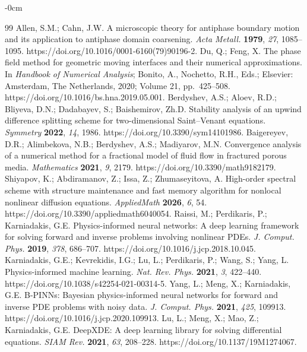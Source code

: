 \documentclass[symmetry,article,submit,moreauthors]{Definitions/mdpi}
\begin{document}
\begin{adjustwidth}{-\extralength}{0cm}

\begin{thebibliography}{99}
 Allen, S.M.; Cahn, J.W. A microscopic theory for antiphase boundary motion and its application to antiphase domain coarsening. \textit{Acta Metall.} \textbf{1979}, \textit{27}, 1085--1095. https://doi.org/10.1016/0001-6160(79)90196-2.
 Du, Q.; Feng, X. The phase field method for geometric moving interfaces and their numerical approximations. In \textit{Handbook of Numerical Analysis}; Bonito, A., Nochetto, R.H., Eds.; Elsevier: Amsterdam, The Netherlands, 2020; Volume 21, pp.\ 425--508. https://doi.org/10.1016/bs.hna.2019.05.001.
 Berdyshev, A.S.; Aloev, R.D.; Bliyeva, D.N.; Dadabayev, S.; Baishemirov, Zh.D. Stability analysis of an upwind difference splitting scheme for two-dimensional Saint--Venant equations. \textit{Symmetry} \textbf{2022}, \textit{14}, 1986. https://doi.org/10.3390/sym14101986.
 Baigereyev, D.R.; Alimbekova, N.B.; Berdyshev, A.S.; Madiyarov, M.N. Convergence analysis of a numerical method for a fractional model of fluid flow in fractured porous media. \textit{Mathematics} \textbf{2021}, \textit{9}, 2179. https://doi.org/10.3390/math9182179.
 Shiyapov, K.; Abdiramanov, Z.; Issa, Z.; Zhumaseyitova, A. High-order spectral scheme with structure maintenance and fast memory algorithm for nonlocal nonlinear diffusion equations. \textit{AppliedMath} \textbf{2026}, \textit{6}, 54. https://doi.org/10.3390/appliedmath6040054.
 Raissi, M.; Perdikaris, P.; Karniadakis, G.E. Physics-informed neural networks: A deep learning framework for solving forward and inverse problems involving nonlinear PDEs. \textit{J. Comput. Phys.} \textbf{2019}, \textit{378}, 686--707. https://doi.org/10.1016/j.jcp.2018.10.045.
 Karniadakis, G.E.; Kevrekidis, I.G.; Lu, L.; Perdikaris, P.; Wang, S.; Yang, L. Physics-informed machine learning. \textit{Nat. Rev. Phys.} \textbf{2021}, \textit{3}, 422--440. https://doi.org/10.1038/s42254-021-00314-5.
 Yang, L.; Meng, X.; Karniadakis, G.E. B-PINNs: Bayesian physics-informed neural networks for forward and inverse PDE problems with noisy data. \textit{J. Comput. Phys.} \textbf{2021}, \textit{425}, 109913. https://doi.org/10.1016/j.jcp.2020.109913.
 Lu, L.; Meng, X.; Mao, Z.; Karniadakis, G.E. DeepXDE: A deep learning library for solving differential equations. \textit{SIAM Rev.} \textbf{2021}, \textit{63}, 208--228. https://doi.org/10.1137/19M1274067.

\end{thebibliography}
\end{adjustwidth}
\end{document}
